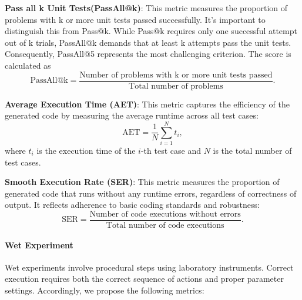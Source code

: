 \begin{tcolorbox}[
    breakable,
    title=Metric Definition of Pass All k Unit Tests,
    colback=LighterGray,
    colframe=DeepPurple,
    colbacktitle=DeepPurple,
    coltitle=White
]
\textbf{Pass all k Unit Tests(PassAll@k)}: This metric measures the proportion of problems with k or more unit tests passed successfully. It's important to distinguish this from Pass@k. While Pass@k requires only one successful attempt out of k trials, PassAll@k demands that at least k attempts pass the unit tests. Consequently, PassAll@5 represents the most challenging criterion. The score is calculated as
\[
\text{PassAll@k} = \frac{\text{Number of problems with k or more unit tests passed}}{\text{Total number of problems}}.
\]
\end{tcolorbox}

\begin{tcolorbox}[
    breakable,
    title=Metric Definition of Average Execution Time,
    colback=LighterGray,
    colframe=DeepPurple,
    colbacktitle=DeepPurple,
    coltitle=White
]
\textbf{Average Execution Time (AET)}: This metric captures the efficiency of the generated code by measuring the average runtime across all test cases:
\[
\text{AET} = \frac{1}{N} \sum_{i=1}^{N} t_i,
\]
where \(t_i\) is the execution time of the \(i\)-th test case and \(N\) is the total number of test cases.
\end{tcolorbox}

\begin{tcolorbox}[
    breakable,
    title=Metric Definition of Smooth Execution Rate,
    colback=LighterGray,
    colframe=DeepPurple,
    colbacktitle=DeepPurple,
    coltitle=White
]
\textbf{Smooth Execution Rate (SER)}: This metric measures the proportion of generated code that runs without any runtime errors, regardless of correctness of output. It reflects adherence to basic coding standards and robustness:
\[
\text{SER} = \frac{\text{Number of code executions without errors}}{\text{Total number of code executions}}.
\]
\end{tcolorbox}

\paragraph{Wet Experiment}

Wet experiments involve procedural steps using laboratory instruments. Correct execution requires both the correct sequence of actions and proper parameter settings. Accordingly, we propose the following metrics:

